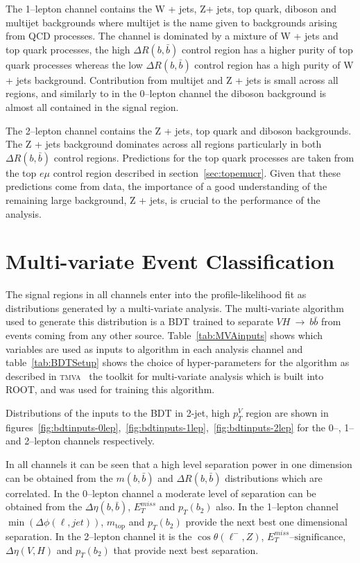 

The 1--lepton channel contains the W + jets, Z+ jets, top quark, diboson and multijet
backgrounds where multijet is the name given to backgrounds arising from QCD
processes. The channel is dominated by a mixture of W + jets and top quark
processes, the high $\Delta R(b, \bar{b})$ control region has a higher purity of
top quark processes whereas the low $\Delta R(b, \bar{b})$ control region has a
high purity of W + jets background. Contribution from multijet and Z + jets is
small across all regions, and similarly to in the 0--lepton channel the diboson
background is almost all contained in the signal region.

The 2--lepton channel contains the Z + jets, top quark and diboson backgrounds.
The Z + jets background dominates across all regions particularly in both
$\Delta R(b, \bar{b})$ control regions. Predictions for the top quark processes
are taken from the top $e \mu$ control region described in
section~\ref{sec:topemucr}. Given that these predictions come from data, the
importance of a good understanding of the remaining large background, Z + jets,
is crucial to the performance of the analysis.

\section{Multi-variate Event Classification}%
\label{sec:mva}

The signal regions in all channels enter into the profile-likelihood fit as
distributions generated by a multi-variate analysis. The multi-variate algorithm
used to generate this distribution is a BDT trained to separate
$VH~\rightarrow~b\bar{b}$ from events coming from any other source.
Table~\ref{tab:MVAinputs} shows which variables are used as inputs to algorithm
in each analysis channel and table~\ref{tab:BDTSetup} shows the choice of
hyper-parameters for the algorithm as described in \textsc{tmva}~\cite{TMVA} the
toolkit for multi-variate analysis which is built into \textsc{ROOT}, and was
used for training this algorithm.


Distributions of the inputs to the BDT in 2-jet, high $p_T^V$ region
are shown in
figures~\ref{fig:bdtinputs-0lep},~\ref{fig:bdtinputs-1lep},~\ref{fig:bdtinputs-2lep}
for the 0--, 1-- and 2--lepton channels respectively.

In all channels it can be seen that a high level separation power in one
dimension can be obtained from the $m(b,\bar{b})$ and $\Delta R (b, \bar{b})$
distributions which are correlated. In the 0--lepton channel a moderate level of
separation can be obtained from the $\Delta \eta(b, \bar{b})$, $E_T^{miss}$ and
$p_T(b_2)$ also. In the 1--lepton channel $\min(\Delta\phi(\ell,jet))$,
$m_{\text{top}}$ and $p_T(b_2)$ provide the next best one dimensional
separation. In the 2--lepton channel it is the $\cos{\theta(\ell^-,Z)}$,
$E_T^{miss}\text{--significance}$, $\Delta \eta(V, H)$ and $p_T(b_2)$ that
provide next best separation.
  
